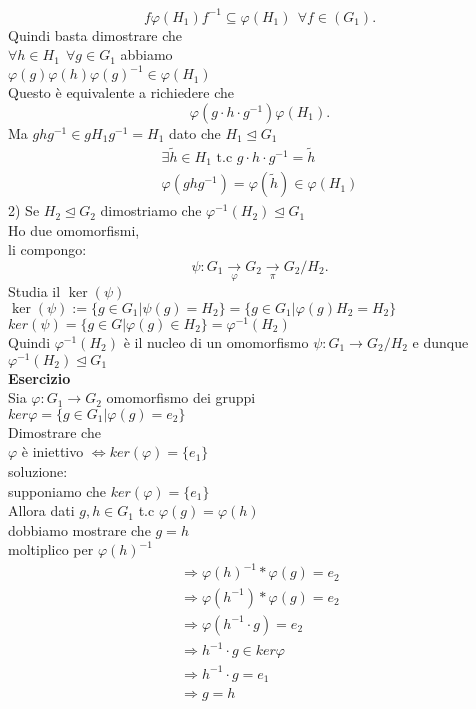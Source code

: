 \documentclass[12px]{article}
\begin{document}
	\[
		f \varphi(H_1) f^{-1}\subseteq \varphi(H_1) \ \ \forall f\in (G_1)
	.\] 
	Quindi basta dimostrare che\\
	$\forall h\in H_1 \ \ \forall g\in G_1$ abbiamo\\
	$ \varphi(g) \varphi(h) \varphi(g)^{-1}\in \varphi(H_1)$\\
	Questo è equivalente a richiedere che\\
	\[
		\varphi(g\cdot h\cdot g^{-1}) \varphi(H_1)
	.\] 
	Ma $ghg^{-1}\in gH_1g^{-1}=H_1$ dato che $H_1\trianglelefteq G_1$\\
	\begin{gather*}
		\exists \tilde h\in H_1 \text { t.c } g\cdot h\cdot g^{-1} = \tilde h\\
		\varphi(ghg^{-1}) = \varphi(\tilde h)\in \varphi(H_1)
	\end{gather*}
	2) Se $H_2\trianglelefteq G_2$ dimostriamo che $ \varphi^{-1}(H_2)\trianglelefteq G_1$\\
	Ho due omomorfismi,\\
	li compongo:
	\[
		\psi: G_1 \xrightarrow[ \varphi]{} G_2 \xrightarrow[\pi]{} G_2/H_2
	.\] 
	Studia il $\ker (\psi)$\\
	 $\ker(\psi):= \lbrace g\in G_1 | \psi (g) = H_2\rbrace = \lbrace g\in G_1 | \varphi(g)H_2 = H_2\rbrace$\\
	 $ker (\psi) = \lbrace g\in G | \varphi(g)\in H_2 \rbrace = \varphi^{-1}(H_2)$\\
	 Quindi $ \varphi^{-1}(H_2)$ è il nucleo di un omomorfismo $\psi : G_1 \rightarrow G_2/H_2$ e dunque $ \varphi^{-1}(H_2)\trianglelefteq G_1$\\
	\textbf{Esercizio}\\
	Sia $ \varphi: G_1 \rightarrow G_2$ omomorfismo dei gruppi\\
	$ker \varphi = \lbrace g\in G_1 | \varphi(g) = e_2\rbrace$\\
	Dimostrare che\\
	$ \varphi$ è iniettivo $ \Leftrightarrow ker( \varphi) = \lbrace e_1 \rbrace$ \\
	soluzione:\\
	supponiamo che $ker ( \varphi) = \lbrace e_1\rbrace$\\
	Allora dati $g,h \in G_1$ t.c $ \varphi (g) = \varphi(h)$\\
	dobbiamo mostrare che $g=h$\\
	moltiplico per  $ \varphi(h)^{-1}$\\
	\begin{gather*}
		\Rightarrow \varphi(h)^{-1} * \varphi(g) = e_2\\
		\Rightarrow \varphi(h^{-1})* \varphi(g) = e_2\\
		\Rightarrow \varphi(h^{-1}\cdot g) = e_2\\
	 \Rightarrow h^{-1}\cdot g\in ker \varphi\\
	 \Rightarrow h^{-1}\cdot g = e_1\\
	 \Rightarrow g = h\\
	\end{gather*}
\end{document}
